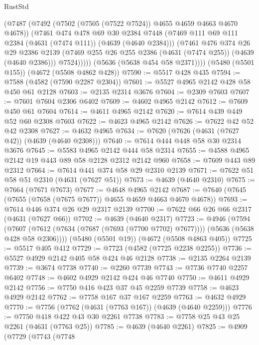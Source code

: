 \begin{lexlean}{RustStd}
\begin{coremodule}
            (@7487
              (@7492 (@7502 (@7505 (@7522 @7524)) @4655 @4659 @4663 @4670 @4678))
              (@7461
                @474
                @478
                @69
                @30
                @2384
                @7448
                (@7469 @111 @69 @111 @2384 (@4631 (@7474 @111)) (@4639 (@4640 @2384)))
                (@7461
                  @476
                  @374
                  @26
                  @29
                  @2386
                  @2139
                  (@7469 @255 @26 @255 @2386 (@4631 (@7474 @255)) (@4639 (@4640 @2386)))
                  @7524)))))
        (@5636 (@5638 @454 @58 @2371))))
    (@5480 (@5501 @155))
    (@4672 (@5508 @4862 @428))
@7590 := @5517 @428 @435
@7594 := @7588 (@4582 (@7590 @2287 @2304))
@7601 := @5527 @4965 @2142 @428 @58 @450 @61 @2128
@7603 := @2135 @2314 @3676
@7604 := @2309 @7603
@7607 := @7601 @7604 @2306 @6402
@7609 := @4602 @4965 @2142
@7612 := @7609 @450 @61 @7604
@7614 := @4611 @4965 @2142
@7620 := @7614 @439 @449 @52 @60 @2308 @7603
@7622 := @4623 @4965 @2142
@7626 := @7622 @42 @52 @42 @2308
@7627 := @4632 @4965
@7634 := @7620 (@7626 (@4631 (@7627 @42)) (@4639 (@4640 @2308)))
@7640 := @7614 @444 @448 @58 @30 @2314 @3676
@7645 := @5583 @4965 @2142 @444 @58 @2314
@7655 := @4588 @4965 @2142 @19 @443 @89 @58 @2128 @2312 @2142 @960
@7658 := @7609 @443 @89 @2312
@7664 := @7614 @441 @374 @58 @29 @2310 @2139
@7671 := @7622 @51 @58 @51 @2310 (@4631 (@7627 @51))
@7673 := @4639 (@4640 @2310)
@7675 := @7664 (@7671 @7673)
@7677 := @4648 @4965 @2142
@7687 := @7640 (@7645 (@7655 (@7658 (@7675 @7677)) @4655 @4659 @4663 @4670 @4678))
@7693 := @7614 @446 @374 @26 @29 @2317 @2139
@7700 := @7622 @66 @26 @66 @2317 (@4631 (@7627 @66))
@7702 := @4639 (@4640 @2317)
@7723 := @4946
    (@7594
      (@7607 (@7612 (@7634 (@7687 (@7693 (@7700 @7702) @7677)))) (@5636 (@5638 @428 @58 @2306))))
    (@5480 (@5501 @19))
    (@4672 (@5508 @4863 @405))
@7725 := @5517 @405 @412
@7729 := @7723 (@4582 (@7725 @2238 @2255))
@7736 := @5527 @4929 @2142 @405 @58 @424 @46 @2128
@7738 := @2135 @2264 @2139
@7739 := @3674 @7738
@7740 := @2260 @7739
@7743 := @7736 @7740 @2257 @6402
@7748 := @4602 @4929 @2142 @424 @46 @7740
@7750 := @4611 @4929 @2142
@7756 := @7750 @416 @423 @37 @45 @2259 @7739
@7758 := @4623 @4929 @2142
@7762 := @7758 @167 @37 @167 @2259
@7763 := @4632 @4929
@7770 := @7756 (@7762 (@4631 (@7763 @167)) (@4639 (@4640 @2259)))
@7776 := @7750 @418 @422 @43 @30 @2261 @7738
@7783 := @7758 @25 @43 @25 @2261 (@4631 (@7763 @25))
@7785 := @4639 (@4640 @2261)
@7825 := @4909
    (@7729
      (@7743
        (@7748

\end{coremodule}
\end{lexlean}
